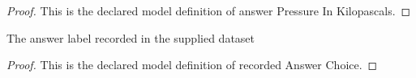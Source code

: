\begin{proof}
  This is the declared model definition of answer Pressure In Kilopascals.
\end{proof}
\begin{definition}
  \label{def:physics:phyx-mini-0384:phyxminiproblems-problemphyxmini0384-recordedanswerchoice}
  The answer label recorded in the supplied dataset
\end{definition}
\begin{proof}
  This is the declared model definition of recorded Answer Choice.
\end{proof}
